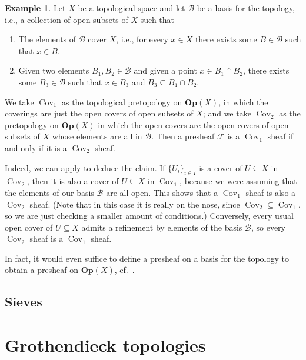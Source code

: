 \documentclass[12pt,a4paper]{amsart}
\theoremstyle{plain}
\theoremstyle{definition}
\newtheorem{exmp}[thm]{Example}
\theoremstyle{remark}
\begin{document}
\begin{exmp}
  Let $X$ be a topological space and let $\mathcal{B}$ be a basis for the topology, i.e., a collection of open subsets of $X$ such that
  \begin{enumerate}
    \item The elements of $\mathcal{B}$ cover $X$, i.e., for every $x \in X$ there exists some $B \in \mathcal{B}$ such that $x \in B$.
    \item Given two elements $B_{1}, B_{2} \in \mathcal{B}$ and given a point $x \in B_{1} \cap B_{2}$, there exists some $B_{3} \in \mathcal{B}$ such that $x \in B_{3}$ and $B_{3} \subseteq B_{1} \cap B_{2}$.
  \end{enumerate}
  We take $\operatorname{Cov}_{1}$ as the topological pretopology on $\mathbf{Op}(X)$, in which the coverings are just the open covers of open subsets of $X$; and we take $\operatorname{Cov}_{2}$ as the pretopology on $\mathbf{Op}(X)$ in which the open covers are the open covers of open subsets of $X$ whose elements are all in $\mathcal{B}$.
  Then a presheaf $\mathscr{F}$ is a $\operatorname{Cov}_{1}$ sheaf if and only if it is a $\operatorname{Cov}_{2}$ sheaf.
  
  Indeed, we can apply  to deduce the claim.
  If $\{ U_{i} \}_{i \in I}$ is a cover of $U\subseteq X$ in $\operatorname{Cov}_{2}$, then it is also a cover of $U\subseteq X$ in $\operatorname{Cov}_{1}$, because we were assuming that the elements of our basis $\mathcal{B}$ are all open.
  This shows that a $\operatorname{Cov}_{1}$ sheaf is also a $\operatorname{Cov}_{2}$ sheaf.
  (Note that in this case it is really on the nose, since $\operatorname{Cov}_{2} \subseteq \operatorname{Cov}_{1}$, so we are just checking a smaller amount of conditions.)
  Conversely, every usual open cover of $U \subseteq X$ admits a refinement by elements of the basis $\mathcal{B}$, so every $\operatorname{Cov}_{2}$ sheaf is a $\operatorname{Cov}_{1}$ sheaf.
\end{exmp}

In fact, it would even suffice to define a presheaf on a basis for the topology to obtain a presheaf on $\mathbf{Op}(X)$, cf.~\cite[Chapter 0, (3.2.1)]{ega}.

\subsection{Sieves}




\section{Grothendieck topologies}
\end{document}
